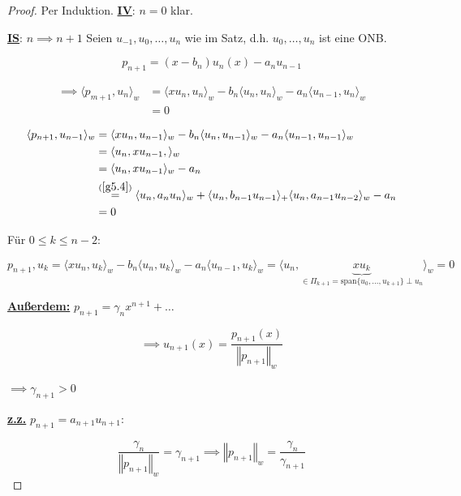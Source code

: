 \documentclass{book}
\begin{document}
            \begin{proof}
                Per Induktion.
                \underline{\textbf{IV}}: $n=0$ klar.

                \underline{\textbf{IS}}: $n\implies n+1$ Seien $u_{-1},u_0,\dots,u_n$ wie im Satz, d.h. 
                $u_0,\dots,u_n$ ist eine ONB.

                \begin{equation}
                    p_{n+1} = (x-b_n)u_n(x)-a_nu_{n-1} \label{g5.5}
                \end{equation}

                \begin{align*}
                    \implies \langle p_{m+1},u_n \rangle_w&=\langle xu_{n},u_n \rangle_w-b_n \langle u_n,u_n \rangle_w-a_n \langle u_{n-1},u_n \rangle_w \\
                    &=0
                \end{align*}

                \begin{align*}
                    \langle p_{n+1},u_{n-1} \rangle_w&=\langle xu_n,u_{n-1} \rangle_w-b_n \langle u_n,u_{n-1} \rangle_w-a_n \langle u_{n-1},u_{n-1} \rangle_w\\
                    &=\langle u_n,xu_{n-1}, \rangle_w\\
                    &=\langle u_n,xu_{n-1} \rangle_w-a_n\\
                    &\stackrel{(\ref{g5.4})}{=} \langle u_n,a_nu_n \rangle_w+\langle u_n,b_{n-1}u_{n-1} \rangle_+\langle u_n,a_{n-1}u_{n-2} \rangle_w -a_n\\
                    &=0
                \end{align*}

                Für $0\leq k\leq n-2$:

                \[p_{n+1},u_k=\langle xu_n,u_k \rangle_w-b_n \langle u_n,u_k \rangle_w-a_n \langle u_{n-1},u_k \rangle_w=\langle u_n,\underbrace{xu_k}_{\in\Pi_{k+1}=\text{span}\{u_0,\dots,u_{k+1}\} \perp u_n} \rangle_w=0\]

                \underline{\textbf{Außerdem:}} $p_{n+1}=\gamma_n x^{n+1}+\dots$

                \[\implies u_{n+1}(x)=\frac{p_{n+1}(x)}{\left\Vert p_{n+1} \right\Vert_w}\]

                $\implies \gamma_{n+1}>0$

                \underline{\textbf{z.z.}} $p_{n+1}=a_{n+1}u_{n+1}$:

                \[\frac{\gamma_n}{\left\Vert p_{n+1} \right\Vert_w}=\gamma_{n+1}\implies \left\Vert p_{n+1} \right\Vert_w=\frac{\gamma_n}{\gamma_{n+1}}\]

            \end{proof}
\end{document}
